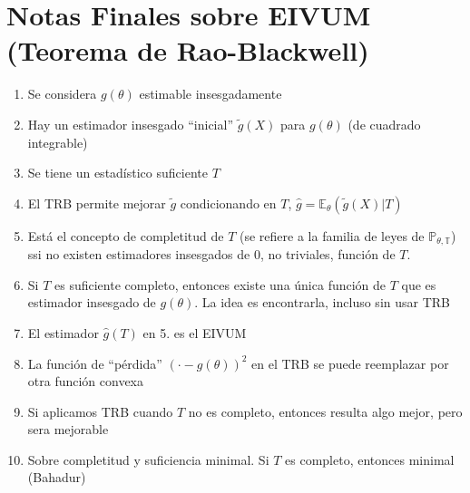 \documentclass[10pt]{article}
\theoremstyle{plain}
\theoremstyle{definition}
\begin{document}
\section{Notas Finales sobre EIVUM (Teorema de Rao-Blackwell)}
\begin{enumerate}
\item Se considera $g(\theta)$ estimable insesgadamente
\item Hay un estimador insesgado ``inicial'' $\tilde{g}(X)$ para $g(\theta)$ (de cuadrado integrable)
\item Se tiene un estadístico suficiente $T$
\item El TRB permite mejorar $\tilde{g}$ condicionando en $T$, $\hat{g}=\mathbb{E}_{\theta}(\tilde{g}(X)|T)$
\item Está el concepto de completitud de $T$ (se refiere a la familia de leyes de $\mathbb{P_{\theta, T}}$) ssi no existen estimadores insesgados de 0, no triviales, función de $T$.
\item Si $T$ es suficiente completo, entonces existe una única función de $T$ que es estimador insesgado de $g(\theta)$. La idea es encontrarla, incluso sin usar TRB
\item El estimador $\hat{g}(T)$ en 5. es el EIVUM
\item La función de ``pérdida'' $(\cdot-g(\theta))^2$ en el TRB se puede reemplazar por otra función convexa
\item Si aplicamos TRB cuando $T$ no es completo, entonces resulta algo mejor, pero sera mejorable
\item Sobre completitud y suficiencia minimal. Si $T$ es completo, entonces minimal (Bahadur)
\end{enumerate}
\end{document}
